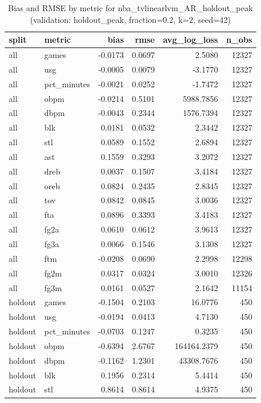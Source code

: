 \begin{table}
\caption{Bias and RMSE by metric for nba_tvlinearlvm_AR_holdout_peak (validation: holdout_peak, fraction=0.2, k=2, seed=42)}
\label{tab:nba_tvlinearlvm_AR_holdout_peak_vs_holdout_peak_f20_k2_s42_bias_rmse}
\begin{tabular}{llrrrr}
\toprule
split & metric & bias & rmse & avg\_log\_loss & n\_obs \\
\midrule
all & games & -0.0173 & 0.0697 & 2.5080 & 12327 \\
all & usg & -0.0005 & 0.0079 & -3.1770 & 12327 \\
all & pct\_minutes & -0.0021 & 0.0252 & -1.7472 & 12327 \\
all & obpm & -0.0214 & 0.5101 & 5988.7856 & 12327 \\
all & dbpm & -0.0043 & 0.2344 & 1576.7394 & 12327 \\
all & blk & 0.0181 & 0.0532 & 2.3442 & 12327 \\
all & stl & 0.0589 & 0.1552 & 2.6894 & 12327 \\
all & ast & 0.1559 & 0.3293 & 3.2072 & 12327 \\
all & dreb & 0.0037 & 0.1507 & 3.4184 & 12327 \\
all & oreb & 0.0824 & 0.2435 & 2.8345 & 12327 \\
all & tov & 0.0842 & 0.0845 & 3.0036 & 12327 \\
all & fta & 0.0896 & 0.3393 & 3.4183 & 12327 \\
all & fg2a & 0.0610 & 0.0612 & 3.9613 & 12327 \\
all & fg3a & 0.0066 & 0.1546 & 3.1308 & 12327 \\
all & ftm & -0.0208 & 0.0690 & 2.2998 & 12298 \\
all & fg2m & 0.0317 & 0.0324 & 3.0010 & 12326 \\
all & fg3m & 0.0161 & 0.0527 & 2.1642 & 11154 \\
holdout & games & -0.1504 & 0.2103 & 16.0776 & 450 \\
holdout & usg & -0.0194 & 0.0413 & 4.7130 & 450 \\
holdout & pct\_minutes & -0.0703 & 0.1247 & 0.3235 & 450 \\
holdout & obpm & -0.6394 & 2.6767 & 164164.2379 & 450 \\
holdout & dbpm & -0.1162 & 1.2301 & 43308.7676 & 450 \\
holdout & blk & 0.1956 & 0.2314 & 5.4414 & 450 \\
holdout & stl & 0.8614 & 0.8614 & 4.9375 & 450 \\

\end{tabular}
\end{table}
